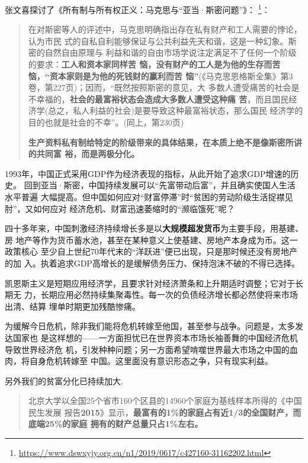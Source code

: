 张文喜探讨了《所有制与所有权正义：马克思与“亚当·斯密问题”》\cite{ZXYJ201404002}：
\footnote{\url{https://www.dswxyjy.org.cn/n1/2019/0617/c427160-31162202.html}}：
\begin{quotation}
  在对斯密等人的评述中，马克思明确指出存在私有财产和工人需要的悖论，认为市民
  式的自私自利能够保证与公共利益先天和谐，这是一种幻象。斯密的自然自由原理与
  利益和谐的自由市场学说注定满足不了任何一个阶级的要求：\textbf{工人和资本家同样苦
  恼，没有财产的工人是为他的生存而苦恼，“资本家则是为他的死钱财的赢利而苦
    恼”}(《马克思恩格斯全集》第3卷，第227页)；因而，“既然按照斯密的意见，大
  多数人遭受痛苦的社会是不幸福的，\textbf{社会的最富裕状态会造成大多数人遭受这种痛
    苦}，而且国民经济学(总之，私人利益的社会)是要导致这种最富裕状态，那么国民
  经济学的目的也就是社会的不幸”。(同上，第230页)

  \textbf{生产资料私有制给特定的阶级带来的具体结果，在本质上绝不是像斯密所讲的共同富
  裕，而是两极分化。}
\end{quotation}

1993年，中国正式采用GDP作为经济表现的指标，从此开始了追求GDP增速的历史。
回到亚当·斯密，中国持续发展可以“先富带动后富”，并且确实使国人生活水平普遍
大幅提高。但中国如何应对“财富停滞”时“贫困的劳动阶级生活捉襟见肘”，又如何应对
经济危机、财富迅速萎缩时的“濒临饿死”呢？

四十多年来，中国刺激经济持续增长多是以\textbf{大规模超发货币}为主要手段，用基建、房
地产等作为货币蓄水池，甚至在某种意义上使基建、房地产本身成为币。这一政策核心
至少自上世纪70年代末的“洋跃进”便已出现，只是那时候还没有房地产的加
入。执着追求GDP高增长的是缓解债务压力、保持泡沫不破的不得已选择。

凯恩斯主义是短期应用经济学，且要求针对经济萧条和上升期适时调整；它对于长期无
力，长期应用必然持续集聚毒性。每一次的负债经济增长都必然使将来市场出清、结算
埋单时期更加残酷惨痛。

为缓解今日危机，除非我们能将危机转嫁至他国，甚至参与战争。问题是，太多发达国家也
是这样想的——一方面担忧已在世界资本市场长袖善舞的中国经济危机导致世界经济危
机，引发种种问题；另一方面希望啃噬世界最大市场之中国的血肉，将自身危机转嫁至
中国。这里面没有意识形态之争，只有现实利益。

另外我们的贫富分化已持续加大.
\begin{quotation}
  北京大学以全国25个省市160个区县的14960个家庭为基线样本所得的《中国民生发展
  报告\textbf{2015}》显示，\textbf{最富有的1\%的家庭占有近1/3的全国财产，而底端25\%的家庭
    拥有的财产总量只占1\%左右。}\cite{dajueqi}
\end{quotation}

